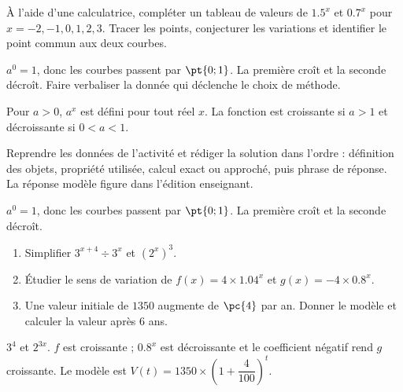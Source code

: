 \begin{activity}
À l'aide d'une calculatrice, compléter un tableau de valeurs de $\num{1,5}^x$ et $\num{0,7}^x$ pour $x=-2,-1,0,1,2,3$. Tracer les points, conjecturer les variations et identifier le point commun aux deux courbes.
\begin{center}\end{center}
\end{activity}
\begin{solution}$a^0=1$, donc les courbes passent par $\pt{0;1}$. La première croît et la seconde décroît. Faire verbaliser la donnée qui déclenche le choix de méthode.\end{solution}

\begin{summary}Pour $a>0$, $a^x$ est défini pour tout réel $x$. La fonction est croissante si $a>1$ et décroissante si $0<a<1$.\end{summary}

\begin{example}
Reprendre les données de l'activité et rédiger la solution dans l'ordre : définition des objets, propriété utilisée, calcul exact ou approché, puis phrase de réponse. La réponse modèle figure dans l'édition enseignant.
\end{example}
\begin{solution}$a^0=1$, donc les courbes passent par $\pt{0;1}$. La première croît et la seconde décroît.\end{solution}

\begin{exercise}[essentiel]
\begin{enumerate}\item Simplifier $3^{x+4}\div3^x$ et $(2^x)^3$.\item Étudier le sens de variation de $f(x)=4\times\num{1,04}^x$ et $g(x)=-4\times\num{0,8}^x$.\item Une valeur initiale de $1350$ augmente de $\pc{4}$ par an. Donner le modèle et calculer la valeur après $6$ ans.\end{enumerate}
\end{exercise}
\begin{solution}$3^4$ et $2^{3x}$. $f$ est croissante ; $\num{0,8}^x$ est décroissante et le coefficient négatif rend $g$ croissante. Le modèle est $V(t)=1350\times\left(1+\dfrac{4}{100}\right)^t$.\end{solution}

